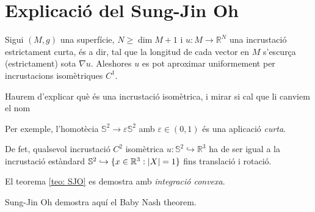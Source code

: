 



























\newpage
\section{Explicació del Sung-Jin Oh}
\begin{teo}\label{teo: SJO} Sigui $(M,g)$ una superfície, $N\ge\dim M+1$ i $u:M\to\mathbb R^N$ una incrustació estrictament curta, és a dir, tal que la longitud de cada vector en $M$ s'escurça (estrictament) sota $\nabla u$. Aleshores $u$ es pot aproximar uniformement per incrustacions isomètriques $C^1$.
\end{teo}
{\color{blue} Haurem d'explicar què és una incrustació isomètrica, i mirar si cal que li canviem el nom}

Per exemple, l'homotècia $\mathbb S^2\to\varepsilon\mathbb S^2$ amb $\varepsilon\in(0,1)$ és una aplicació \textit{curta}. 
\begin{obs}
De fet, qualsevol incrustació $C^2$ isomètrica $u:\mathbb S^2\hookrightarrow\mathbb R^3$ ha de ser igual a la incrustació estàndard $\mathbb S^2 \hookrightarrow\{ x\in\mathbb R^3 : |X| = 1 \}$ fins translació i rotació. 
\end{obs}

El teorema \ref{teo: SJO} es demostra amb \textit{integració convexa}.

Sung-Jin Oh demostra aquí el Baby Nash theorem.


